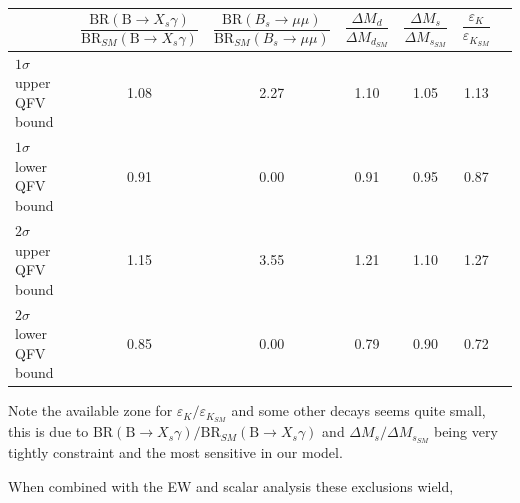 \begin{table}[H]
\centering
\begin{tabular}{|l|c|c|c|c|c|c} 
\hline
                           & $\dfrac{\textrm{BR} ( \textrm{B} \rightarrow X_s \gamma)}{\textrm{BR}_{SM} ( \textrm{B} \rightarrow X_s \gamma )}$ 
                           &  $\dfrac{ \textrm{BR} (B_s  \longrightarrow  \mu  \mu )}{\textrm{BR}_{SM}(B_s  \longrightarrow  \mu  \mu ) }$  
                           & $\dfrac{\Delta M_d}{\Delta M_{d_{SM}} }$ 
                           & $\dfrac{\Delta M_s}{\Delta M_{s_{SM}} }$
                           & $\dfrac{\varepsilon_K}{\varepsilon_{K_{SM}}}$   \\ \hline 
$1 \sigma$ upper QFV bound &  1.08    &  2.27   &  1.10     &  1.05     &    1.13    \\ \hline 
$1 \sigma$ lower QFV bound &  0.91    &  0.00   &  0.91     &  0.95     &    0.87    \\ \hline 
$2 \sigma$ upper QFV bound &  1.15    &  3.55   &  1.21     &  1.10     &    1.27    \\ \hline 
$2 \sigma$ lower QFV bound &  0.85    &  0.00   &  0.79     &  0.90     &    0.72    \\ \hline  
\end{tabular}
\end{table}

Note the available zone for $\varepsilon_K/\varepsilon_{K_{SM}}$ and some other decays seems quite small, this is due to ${\textrm{BR} ( \textrm{B} \rightarrow X_s \gamma)}/{\textrm{BR}_{SM} ( \textrm{B} \rightarrow X_s \gamma )}$ and ${\Delta M_s}/{\Delta M_{s_{SM}} }$ being very tightly constraint and the most sensitive in our model.

When combined with the EW and scalar analysis these exclusions wield, 

